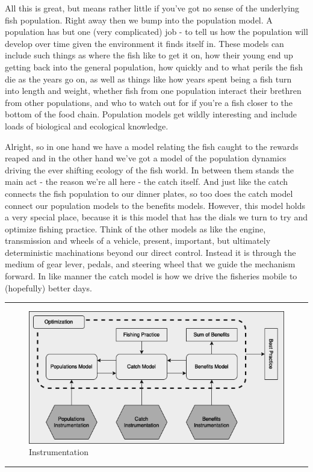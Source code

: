 \documentclass[11pt,a5paper]{book}
\begin{document}
All this is great, but means rather little if you've got no sense of the underlying fish population. Right away then we bump into the population model. A population has but one (very complicated) job - to tell us how the population will develop over time given the environment it finds itself in. These models can include such things as where the fish like to get it on, how their young end up getting back into the general population, how quickly and to what perils the fish die as the years go on, as well as things like how years spent being a fish turn into length and weight, whether fish from one population interact their brethren from other populations, and who to watch out for if you're a fish closer to the bottom of the food chain. Population models get wildly interesting and include loads of biological and ecological knowledge. 
\newline

Alright, so in one hand we have a model relating the fish caught to the rewards reaped and in the other hand we've got a model of the population dynamics driving the ever shifting ecology of the fish world. In between them stands the main act - the reason we're all here - the catch itself. And just like the catch connects the fish population to our dinner plates, so too does the catch model connect our population models to the benefits models. However, this model holds a very special place, because it is this model that has the dials we turn to try and optimize fishing practice. Think of the other models as like the engine, transmission and wheels of a vehicle, present, important, but ultimately deterministic machinations beyond our direct control. Instead it is through the medium of gear lever, pedals, and steering wheel that we guide the mechanism forward. In like manner the catch model is how we drive the fisheries mobile to (hopefully) better days. 
\newpage

\noindent \rule{\textwidth}{0.5pt} 
\begin{figure}[h!] 
  \includegraphics[width=\linewidth]{drawings/high_level_instrumentation.png}
  \caption{Instrumentation}
  \label{fig:high_level_instrumentation}
\end{figure}
\newline
\rule{\textwidth}{0.5pt} 
\vspace{5pt}
\end{document}

